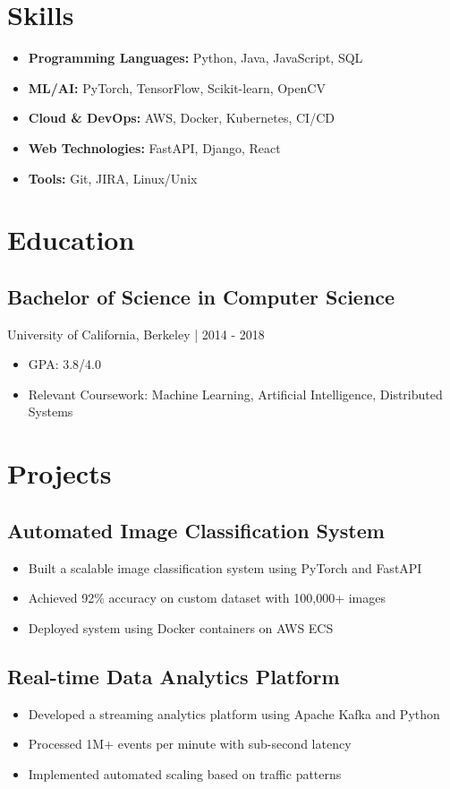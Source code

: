 \documentclass[11pt,a4paper]{article}
\begin{document}
\section*{Skills}
\begin{itemize}
    \item \textbf{Programming Languages:} Python, Java, JavaScript, SQL
    \item \textbf{ML/AI:} PyTorch, TensorFlow, Scikit-learn, OpenCV
    \item \textbf{Cloud \& DevOps:} AWS, Docker, Kubernetes, CI/CD
    \item \textbf{Web Technologies:} FastAPI, Django, React
    \item \textbf{Tools:} Git, JIRA, Linux/Unix
\end{itemize}

\section*{Education}
\subsection*{Bachelor of Science in Computer Science}
University of California, Berkeley | 2014 - 2018
\begin{itemize}
    \item GPA: 3.8/4.0
    \item Relevant Coursework: Machine Learning, Artificial Intelligence, Distributed Systems
\end{itemize}

\section*{Projects}
\subsection*{Automated Image Classification System}
\begin{itemize}
    \item Built a scalable image classification system using PyTorch and FastAPI
    \item Achieved 92\% accuracy on custom dataset with 100,000+ images
    \item Deployed system using Docker containers on AWS ECS
\end{itemize}

\subsection*{Real-time Data Analytics Platform}
\begin{itemize}
    \item Developed a streaming analytics platform using Apache Kafka and Python
    \item Processed 1M+ events per minute with sub-second latency
    \item Implemented automated scaling based on traffic patterns
\end{itemize}
\end{document}
